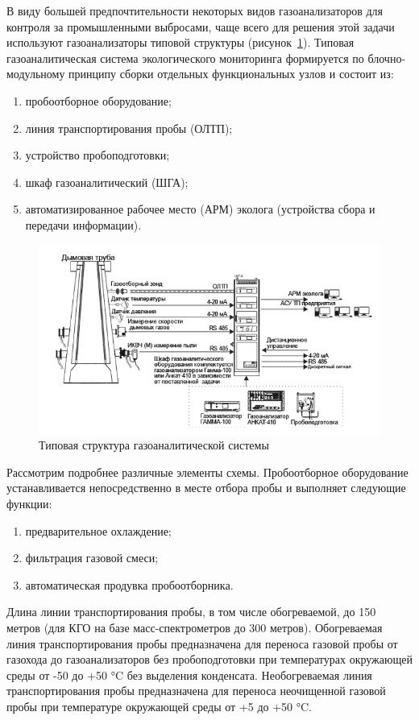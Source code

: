 \documentclass[14pt, a4paper]{extreport}
\begin{document}
	В виду большей предпочтительности некоторых видов газоанализаторов для контроля за промышленными выбросами, чаще всего для решения этой задачи используют газоанализаторы типовой структуры (рисунок~\ref{fig:typestructure}). Типовая газоаналитическая система экологического мониторинга формируется по блочно-модульному принципу сборки отдельных функциональных узлов и состоит из:
	\begin{enumerate}[label={\arabic*)}]
		\item пробоотборное оборудование;
		\item линия транспортирования пробы (ОЛТП);
		\item устройство пробоподготовки;
		\item шкаф газоаналитический (ШГА);
		\item автоматизированное рабочее место (АРМ) эколога (устройства сбора и передачи информации).
	\end{enumerate}
	
	\begin{figure}[h!]
		\centering
		\includegraphics[width = 13cm]{image/chapter_1/typestructure}	
		\caption{Типовая структура газоаналитической системы}
 		\label{fig:typestructure}
	\end{figure}

	Рассмотрим подробнее различные элементы схемы. Пробоотборное оборудование устанавливается непосредственно в месте отбора пробы и выполняет следующие функции:
	\begin{enumerate}[label={\arabic*)}]
		\item предварительное охлаждение;
		\item фильтрация газовой смеси;
		\item автоматическая продувка пробоотборника.
	\end{enumerate}

	Длина линии транспортирования пробы, в том числе обогреваемой, до 150 метров (для КГО на базе масс-спектрометров до 300 метров). Обогреваемая линия транспортирования пробы предназначена для переноса газовой пробы от газохода до газоанализаторов без пробоподготовки при температурах окружающей среды от -50 до +50 °C без выделения конденсата. Необогреваемая линия транспортирования пробы предназначена для переноса неочищенной газовой пробы при температуре окружающей среды от +5 до +50 °C.
	
\end{document}
